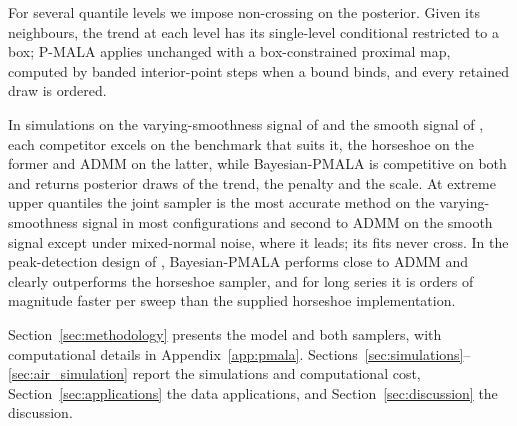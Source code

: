 For several quantile levels we impose non-crossing on the posterior. Given its neighbours, the trend at each level has its single-level conditional restricted to a box; P-MALA applies unchanged with a box-constrained proximal map, computed by banded interior-point steps when a bound binds, and every retained draw is ordered.

In simulations on the varying-smoothness signal of \citet{onizuka2024fast} and the smooth signal of \citet{brantley2020baseline}, each competitor excels on the benchmark that suits it, the horseshoe on the former and ADMM on the latter, while Bayesian-PMALA is competitive on both and returns posterior draws of the trend, the penalty and the scale. At extreme upper quantiles the joint sampler is the most accurate method on the varying-smoothness signal in most configurations and second to ADMM on the smooth signal except under mixed-normal noise, where it leads; its fits never cross. In the peak-detection design of \citet{brantley2020baseline}, Bayesian-PMALA performs close to ADMM and clearly outperforms the horseshoe sampler, and for long series it is orders of magnitude faster per sweep than the supplied horseshoe implementation.

Section~\ref{sec:methodology} presents the model and both samplers, with computational details in Appendix~\ref{app:pmala}. Sections~\ref{sec:simulations}--\ref{sec:air_simulation} report the simulations and computational cost, Section~\ref{sec:applications} the data applications, and Section~\ref{sec:discussion} the discussion.
